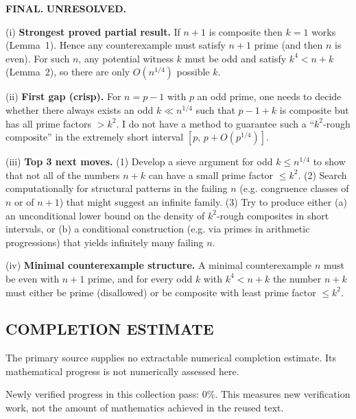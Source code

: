 \textbf{FINAL.}
\textbf{UNRESOLVED.}

(i) \textbf{Strongest proved partial result.}
If $n+1$ is composite then $k=1$ works (Lemma~1). Hence any counterexample must satisfy $n+1$ prime (and then $n$ is even). For such $n$, any potential witness $k$ must be odd and satisfy $k^{4}<n+k$ (Lemma~2), so there are only $O(n^{1/4})$ possible $k$.

(ii) \textbf{First gap (crisp).}
For $n=p-1$ with $p$ an odd prime, one needs to decide whether there always exists an odd $k\ll n^{1/4}$ such that $p-1+k$ is composite but has all prime factors $>k^{2}$. I do not have a method to guarantee such a ``$k^{2}$-rough composite'' in the extremely short interval $[p,\,p+O(p^{1/4})]$.

(iii) \textbf{Top 3 next moves.}
(1) Develop a sieve argument for odd $k\le n^{1/4}$ to show that not all of the numbers $n+k$ can have a small prime factor $\le k^{2}$.
(2) Search computationally for structural patterns in the failing $n$ (e.g. congruence classes of $n$ or of $n+1$) that might suggest an infinite family.
(3) Try to produce either (a) an unconditional lower bound on the density of $k^{2}$-rough composites in short intervals, or (b) a conditional construction (e.g. via primes in arithmetic progressions) that yields infinitely many failing $n$.

(iv) \textbf{Minimal counterexample structure.}
A minimal counterexample $n$ must be even with $n+1$ prime, and for every odd $k$ with $k^{4}<n+k$ the number $n+k$ must either be prime (disallowed) or be composite with least prime factor $\le k^{2}$.




\subsection*{COMPLETION ESTIMATE}
The primary source supplies no extractable numerical completion estimate. Its mathematical progress is not numerically assessed here.

Newly verified progress in this collection pass: $0\%$. This measures new verification work, not the amount of mathematics achieved in the reused text.
